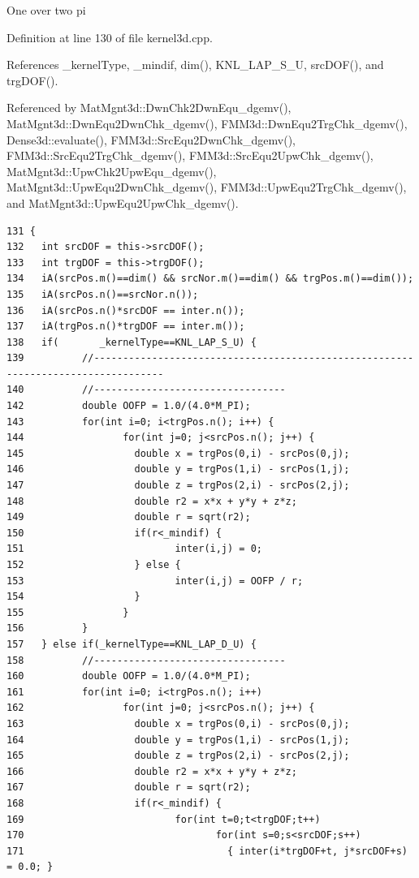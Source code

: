 One over two pi 

Definition at line 130 of file kernel3d.cpp.

References \_\-kernel\-Type, \_\-mindif, dim(), KNL\_\-LAP\_\-S\_\-U, src\-DOF(), and trg\-DOF().

Referenced by Mat\-Mgnt3d::Dwn\-Chk2Dwn\-Equ\_\-dgemv(), Mat\-Mgnt3d::Dwn\-Equ2Dwn\-Chk\_\-dgemv(), FMM3d::Dwn\-Equ2Trg\-Chk\_\-dgemv(), Dense3d::evaluate(), FMM3d::Src\-Equ2Dwn\-Chk\_\-dgemv(), FMM3d::Src\-Equ2Trg\-Chk\_\-dgemv(), FMM3d::Src\-Equ2Upw\-Chk\_\-dgemv(), Mat\-Mgnt3d::Upw\-Chk2Upw\-Equ\_\-dgemv(), Mat\-Mgnt3d::Upw\-Equ2Dwn\-Chk\_\-dgemv(), FMM3d::Upw\-Equ2Trg\-Chk\_\-dgemv(), and Mat\-Mgnt3d::Upw\-Equ2Upw\-Chk\_\-dgemv().

\footnotesize\begin{verbatim}131 {
132   int srcDOF = this->srcDOF();
133   int trgDOF = this->trgDOF();
134   iA(srcPos.m()==dim() && srcNor.m()==dim() && trgPos.m()==dim());
135   iA(srcPos.n()==srcNor.n());
136   iA(srcPos.n()*srcDOF == inter.n());
137   iA(trgPos.n()*trgDOF == inter.m());
138   if(       _kernelType==KNL_LAP_S_U) {
139          //----------------------------------------------------------------------------------
140          //---------------------------------
142          double OOFP = 1.0/(4.0*M_PI);
143          for(int i=0; i<trgPos.n(); i++) {
144                 for(int j=0; j<srcPos.n(); j++) {
145                   double x = trgPos(0,i) - srcPos(0,j);
146                   double y = trgPos(1,i) - srcPos(1,j);
147                   double z = trgPos(2,i) - srcPos(2,j);
148                   double r2 = x*x + y*y + z*z;
149                   double r = sqrt(r2);
150                   if(r<_mindif) {
151                          inter(i,j) = 0;
152                   } else {
153                          inter(i,j) = OOFP / r;
154                   }
155                 }
156          }
157   } else if(_kernelType==KNL_LAP_D_U) {
158          //---------------------------------
160          double OOFP = 1.0/(4.0*M_PI);
161          for(int i=0; i<trgPos.n(); i++)
162                 for(int j=0; j<srcPos.n(); j++) {
163                   double x = trgPos(0,i) - srcPos(0,j);
164                   double y = trgPos(1,i) - srcPos(1,j);
165                   double z = trgPos(2,i) - srcPos(2,j);
166                   double r2 = x*x + y*y + z*z;
167                   double r = sqrt(r2);
168                   if(r<_mindif) {
169                          for(int t=0;t<trgDOF;t++)
170                                 for(int s=0;s<srcDOF;s++)
171                                   { inter(i*trgDOF+t, j*srcDOF+s) = 0.0; }

\end{verbatim}
